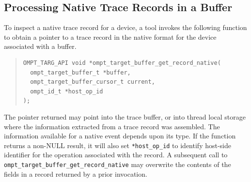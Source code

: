 \documentclass{article}
\begin{document}

\subsection{Processing Native Trace Records in a Buffer}
\label{sec:native-record-data}

To inspect a native trace record for a device, a tool invokes the following function to obtain a pointer to a trace record in the native format for the device associated with a buffer. \begin{quote}
\begin{verbatim}
OMPT_TARG_API void *ompt_target_buffer_get_record_native(
  ompt_target_buffer_t *buffer, 
  ompt_target_buffer_cursor_t current,
  ompt_id_t *host_op_id
);
\end{verbatim}
\end{quote}
The pointer returned  may point into the trace buffer, or into thread local storage where the information extracted from a trace record was assembled. The information available for a native event depends upon its type. If the function returns a non-NULL result, it will also set \verb|*host_op_id| to identify host-side identifier for the operation associated with the record.
A subsequent call to \verb|ompt_target_buffer_get_record_native| may overwrite the contents of the fields in a record returned by a prior invocation.
\end{document}
